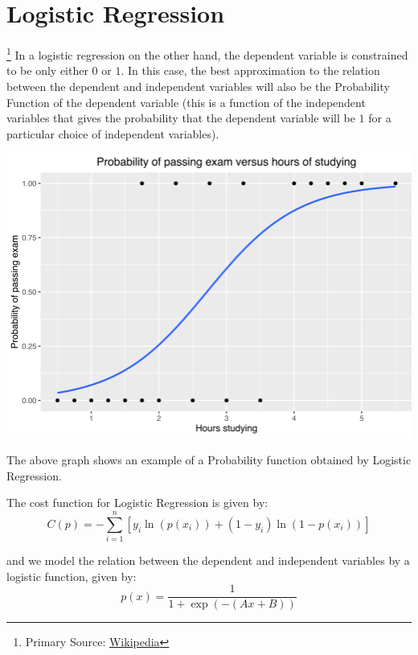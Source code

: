 \documentclass[12 pt]{report}
\begin{document}
    \section{Logistic Regression} \footnote {Primary Source: \href{https://en.wikipedia.org/wiki/Logistic_regression}{Wikipedia}}
    In a logistic regression on the other hand, the dependent variable is constrained to be only either $0$ or $1$.
    In this case, the best approximation to the relation between the dependent and independent variables will also be the
    Probability Function of the dependent variable (this is a function of the independent variables that gives the probability 
    that the dependent variable will be $1$ for a particular choice of independent variables).



    \begin{center}
        \includegraphics[scale = 0.55]{logistic.png}
    \end{center}

    The above graph shows an example of a Probability function obtained by Logistic Regression.
    
    The cost function for Logistic Regression is given by:
    \begin{equation}
        C(p) = -\sum_{i = 1}^{n} [y_{i}\ln(p(x_{i})) + (1-y_{i})\ln(1 - p(x_{i}))]
    \end{equation}

    and we model the relation between the dependent and independent variables by a logistic function, given by:
    \begin{equation}
        p(x) = \frac{1}{1 + \exp(-(Ax + B))}
    \end{equation}
\end{document}
